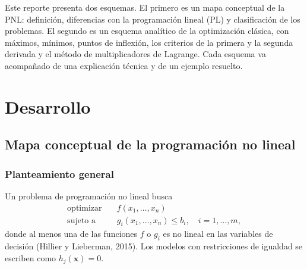 \documentclass[12pt,letterpaper]{article}
\begin{document}
Este reporte presenta dos esquemas. El primero es un mapa conceptual de la PNL: definición, diferencias con la programación lineal (PL) y clasificación de los problemas. El segundo es un esquema analítico de la optimización clásica, con máximos, mínimos, puntos de inflexión, los criterios de la primera y la segunda derivada y el método de multiplicadores de Lagrange. Cada esquema va acompañado de una explicación técnica y de un ejemplo resuelto.

\section{Desarrollo}

\subsection{Mapa conceptual de la programación no lineal}

\subsubsection{Planteamiento general}

Un problema de programación no lineal busca
\begin{equation}
	\begin{aligned}
		\text{optimizar}\quad & f(x_1,\dots,x_n)                             \\
		\text{sujeto a}\quad  & g_i(x_1,\dots,x_n)\le b_i,\quad i=1,\dots,m,
	\end{aligned}
\end{equation}
donde al menos una de las funciones $f$ o $g_i$ es no lineal en las variables de decisión (Hillier y Lieberman, 2015). Los modelos con restricciones de igualdad se escriben como $h_j(\mathbf{x})=0$.
\end{document}
